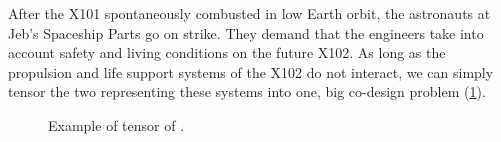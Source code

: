     \begin{example}
        After the X101 spontaneously combusted in low Earth orbit, the astronauts at Jeb's Spaceship Parts go on strike.
        They demand that the engineers take into account safety and living conditions on the future X102.
        As long as the propulsion and life support systems of the X102 do not interact, we can simply tensor the two  representing these systems into one, big co-design problem (\cref{fig:examplemonoidal}).
        \begin{figure}[h!]
            \centering
            \caption{Example of tensor of . }
            \label{fig:examplemonoidal}
        \end{figure}
    \end{example}
